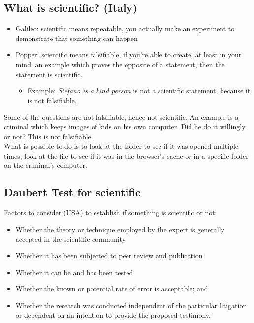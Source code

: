     \subsection{What is scientific? (Italy)}
        \begin{itemize}
            \item Galileo: scientific means repeatable, you actually make an experiment to demonstrate that something can happen
            \item Popper: scientific means falsifiable, if you're able to create, at least in your mind, an example which proves the opposite of a statement, then the statement is scientific.
            \begin{itemize}
                \item Example: \textit{Stefano is a kind person} is not a scientific statement, because it is not falsifiable.
            \end{itemize}
        \end{itemize}
        Some of the questions are not falsifiable, hence not scientific. An example is a criminal which keeps images of kids on his own computer. Did he do it willingly or not? This is not falsifiable.\\
        What is possible to do is to look at the folder to see if it was opened multiple times, look at the file to see if it was in the browser's cache or in a specific folder on the criminal's computer.
    \subsection{Daubert Test for scientific}
    Factors to consider (USA) to establish if something is scientific or not:
    \begin{itemize}
        \item Whether the theory or technique employed by the expert is generally accepted in the scientific community
        \item Whether it has been subjected to peer review and publication
        \item Whether it can be and has been tested
        \item Whether the known or potential rate of error is acceptable; and
        \item Whether the research was conducted independent of the particular litigation or dependent on an intention to provide the proposed testimony.
    \end{itemize}
